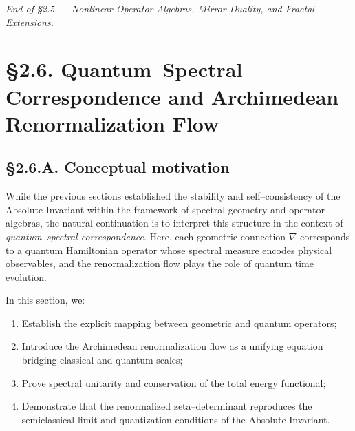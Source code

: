 \begin{center}
\textit{End of §2.5 — Nonlinear Operator Algebras, Mirror Duality, and Fractal Extensions.}
\end{center}


\section{§2.6. Quantum–Spectral Correspondence and Archimedean Renormalization Flow}
\label{sec:2.6-quantum}

\subsection*{§2.6.A. Conceptual motivation}

While the previous sections established the stability and self–consistency of the Absolute Invariant within the framework of spectral geometry and operator algebras, the natural continuation is to interpret this structure in the context of \emph{quantum–spectral correspondence}.
Here, each geometric connection $\nabla$ corresponds to a quantum Hamiltonian operator whose spectral measure encodes physical observables, and the renormalization flow plays the role of quantum time evolution.

In this section, we:
\begin{enumerate}
  \item Establish the explicit mapping between geometric and quantum operators;
  \item Introduce the Archimedean renormalization flow as a unifying equation bridging classical and quantum scales;
  \item Prove spectral unitarity and conservation of the total energy functional;
  \item Demonstrate that the renormalized zeta–determinant reproduces the semiclassical limit and quantization conditions of the Absolute Invariant.
\end{enumerate}


